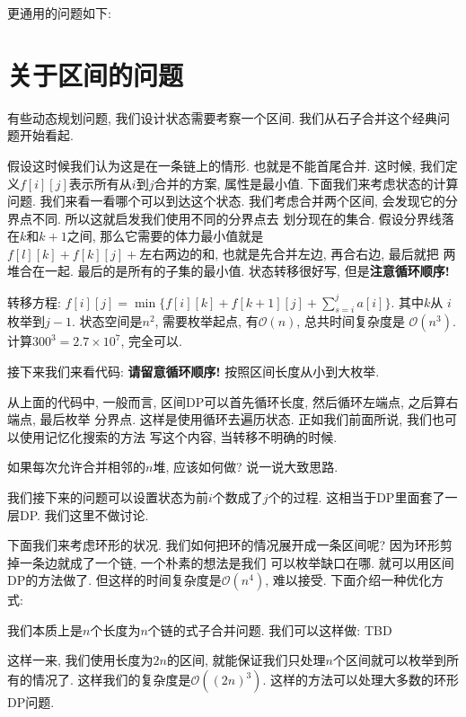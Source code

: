 更通用的问题如下: 




\section{关于区间的问题}

有些动态规划问题, 我们设计状态需要考察一个区间. 我们从石子合并这个经典问题开始看起. 

 假设这时候我们认为这是在一条链上的情形. 也就是不能首尾合并.
这时候, 我们定义$f[i][j]$表示所有从$i$到$j$合并的方案, 
属性是最小值. 下面我们来考虑状态的计算问题. 我们来看一看哪个可以到达这个状态. 
我们考虑合并两个区间, 会发现它的分界点不同. 所以这就启发我们使用不同的分界点去
划分现在的集合. 假设分界线落在$k$和$k+1$之间, 那么它需要的体力最小值就是
$f[l][k]+f[k][j]+\text{左右两边的和}$, 也就是先合并左边, 再合右边, 最后就把
两堆合在一起.  最后的是所有的子集的最小值. 状态转移很好写, 但是\textbf{注意循环顺序!}

转移方程: $f[i][j] = \min\{f[i][k]+f[k+1][j]+\sum_{s=i}^j a[i]\}$. 其中$k$从
$i$枚举到$j-1$. 状态空间是$n^2$, 需要枚举起点, 有$\mathcal O(n)$, 总共时间复杂度是
$\mathcal O(n^3)$. 计算$300^3=2.7\times 10^7$, 完全可以. 

接下来我们来看代码: \textbf{请留意循环顺序! } 按照区间长度从小到大枚举. 

从上面的代码中, 一般而言, 区间DP可以首先循环长度, 然后循环左端点, 之后算右端点, 最后枚举
分界点. 这样是使用循环去遍历状态. 正如我们前面所说, 我们也可以使用记忆化搜索的方法
写这个内容, 当转移不明确的时候. 

\begin{ques}
    如果每次允许合并相邻的$n$堆, 应该如何做? 说一说大致思路. 
\end{ques}

我们接下来的问题可以设置状态为前$i$个数成了$j$个的过程. 这相当于DP里面套了一层DP. 
我们这里不做讨论. 

 下面我们来考虑环形的状况. 我们如何把环的情况展开成一条区间呢? 
因为环形剪掉一条边就成了一个链, 一个朴素的想法是我们
可以枚举缺口在哪. 就可以用区间DP的方法做了. 但这样的时间复杂度是$\mathcal O(n^4)$,
难以接受. 下面介绍一种优化方式: 

我们本质上是$n$个长度为$n$个链的式子合并问题. 我们可以这样做: TBD

这样一来, 我们使用长度为$2n$的区间, 就能保证我们只处理$n$个区间就可以枚举到所有的情况了. 
这样我们的复杂度是$\mathcal O((2n)^3)$. 这样的方法可以处理大多数的环形DP问题. 

